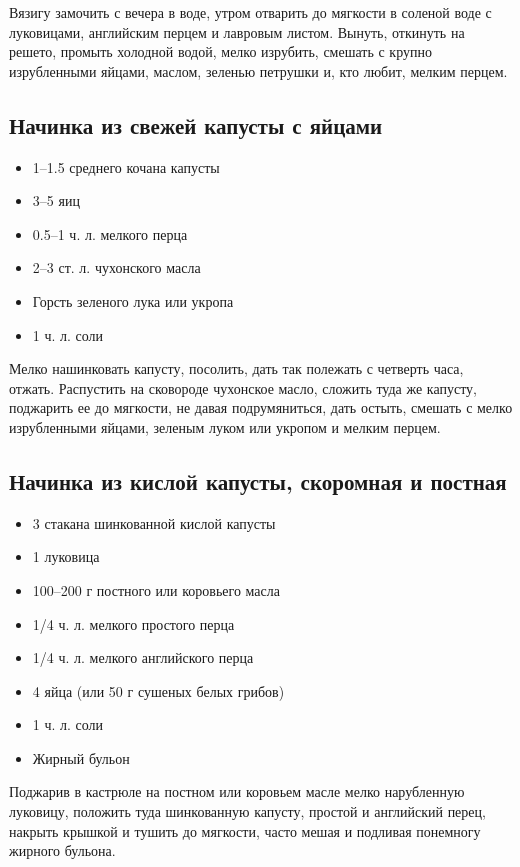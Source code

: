 Вязигу замочить с вечера в воде, утром отварить до мягкости в соленой воде с луковицами, английским перцем и лавровым листом. Вынуть, откинуть на решето, промыть холодной водой, мелко изрубить, смешать с крупно изрубленными яйцами, маслом, зеленью петрушки и, кто любит, мелким перцем.

\subsection{Начинка из свежей капусты с яйцами}

\begin{itemize}
	\item 1–1.5 среднего кочана капусты
    \item 3–5 яиц
    \item 0.5–1 ч. л. мелкого перца 
    \item 2–3 ст. л. чухонского масла 
    \item Горсть зеленого лука или укропа 
    \item 1 ч. л. соли
\end{itemize}

Мелко нашинковать капусту, посолить, дать так полежать с четверть часа, отжать. Распустить на сковороде чухонское масло, сложить туда же капусту, поджарить ее до мягкости, не давая подрумяниться, дать остыть, смешать с мелко изрубленными яйцами, зеленым луком или укропом и мелким перцем.

\subsection{Начинка из кислой капусты, скоромная и постная}

\begin{itemize}
	\item 3 стакана шинкованной кислой капусты 
    \item 1 луковица 
    \item 100–200 г постного или коровьего масла 
    \item 1/4 ч. л. мелкого простого перца 
    \item 1/4 ч. л. мелкого английского перца 
    \item 4 яйца (или 50 г сушеных белых грибов) 
    \item 1 ч. л. соли 
    \item Жирный бульон
\end{itemize}

Поджарив в кастрюле на постном или коровьем масле мелко нарубленную луковицу, положить туда шинкованную капусту, простой и английский перец, накрыть крышкой и тушить до мягкости, часто мешая и подливая понемногу жирного бульона.

